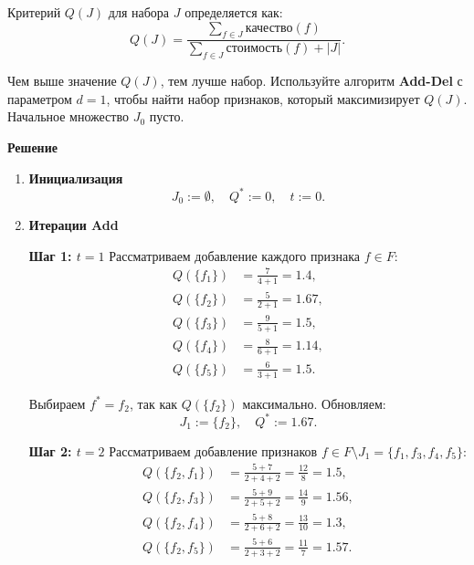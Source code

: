 Критерий \( Q(J) \) для набора \( J \) определяется как:
\[
    Q(J) = \frac{\sum_{f \in J} \text{качество}(f)}{\sum_{f \in J} \text{стоимость}(f) + |J|}.
\]

Чем выше значение \( Q(J) \), тем лучше набор. Используйте алгоритм \textbf{Add-Del} с параметром \( d = 1 \), чтобы найти набор признаков, который максимизирует \( Q(J) \). Начальное множество \( J_0 \) пусто.

\bigskip



\textbf{Решение}

\begin{enumerate}

    \item \textbf{Инициализация}
          \[
              J_0 := \emptyset, \quad Q^* := 0, \quad t := 0.
          \]

    \item \textbf{Итерации Add}

          \textbf{Шаг 1: \( t = 1 \)}
          Рассматриваем добавление каждого признака \( f \in F \):
          \[
              \begin{aligned}
                  Q(\{f_1\}) & = \frac{7}{4 + 1} = 1.4,  \\
                  Q(\{f_2\}) & = \frac{5}{2 + 1} = 1.67, \\
                  Q(\{f_3\}) & = \frac{9}{5 + 1} = 1.5,  \\
                  Q(\{f_4\}) & = \frac{8}{6 + 1} = 1.14, \\
                  Q(\{f_5\}) & = \frac{6}{3 + 1} = 1.5.
              \end{aligned}
          \]

          Выбираем \( f^* = f_2 \), так как \( Q(\{f_2\}) \) максимально.
          Обновляем:
          \[
              J_1 := \{f_2\}, \quad Q^* := 1.67.
          \]

          \textbf{Шаг 2: \( t = 2 \)}
          Рассматриваем добавление признаков \( f \in F \setminus J_1 = \{f_1, f_3, f_4, f_5\} \):
          \[
              \begin{aligned}
                  Q(\{f_2, f_1\}) & = \frac{5 + 7}{2 + 4 + 2} = \frac{12}{8} = 1.5,  \\
                  Q(\{f_2, f_3\}) & = \frac{5 + 9}{2 + 5 + 2} = \frac{14}{9} = 1.56, \\
                  Q(\{f_2, f_4\}) & = \frac{5 + 8}{2 + 6 + 2} = \frac{13}{10} = 1.3, \\
                  Q(\{f_2, f_5\}) & = \frac{5 + 6}{2 + 3 + 2} = \frac{11}{7} = 1.57.
              \end{aligned}
          \]


\end{enumerate}

